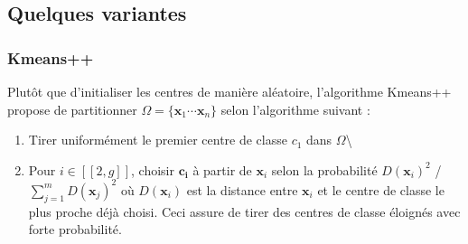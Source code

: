 \documentclass[letterpaper,10pt,english]{jupyterBook}
\begin{document}
\subsection{Quelques variantes}
\label{\detokenize{clustering:quelques-variantes}}

\subsubsection{K\sphinxhyphen{}means++}
\label{\detokenize{clustering:k-means}}
\sphinxAtStartPar
Plutôt que d’initialiser les centres de manière aléatoire, l’algorithme K\sphinxhyphen{}means++ propose de partitionner \(\Omega=\{\mathbf x_1\cdots \mathbf x_n\}\) selon l’algorithme suivant :
\begin{enumerate}
%
\item {} 
\sphinxAtStartPar
Tirer uniformément le premier centre de classe \(c_1\) dans \(\Omega\)\textbackslash{}

\item {} 
\sphinxAtStartPar
Pour \(i\in[\![2,g]\!]\), choisir \(\mathbf{c_i}\) à partir de \(\mathbf x_i\) selon la probabilité \(D(\mathbf{x}_i)^2\) / \(\displaystyle\sum\limits_{j=1}^{m}{D(\mathbf{x}_j)}^2\) où  \(D(\mathbf{x}_i)\) est la distance entre \(\mathbf{x}_i\) et le centre de classe le plus proche déjà choisi. Ceci assure de tirer des centres de classe éloignés avec forte probabilité.

\end{enumerate}
\end{document}
